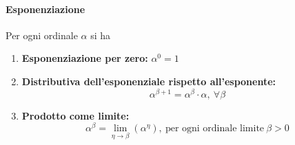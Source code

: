 \paragraph{Esponenziazione}
\begin{define}
		Per ogni ordinale $\alpha$ si ha
	\begin{enumerate}
		\item \textbf{Esponenziazione per zero:}
		$\alpha^0=1$
		\item \textbf{Distributiva dell'esponenziale rispetto all'esponente:}
		\begin{equation*}
			\alpha^{\beta+1}=\alpha^\beta\cdot\alpha,\ \forall \beta
		\end{equation*}
		\item \textbf{Prodotto come limite:}
		\begin{equation*}
			\alpha^{\beta}=\lim_{\eta\to\beta}\left(\alpha^\eta\right),\ \text{per ogni ordinale limite}\ \beta>0
		\end{equation*}
	\end{enumerate}
\end{define}
